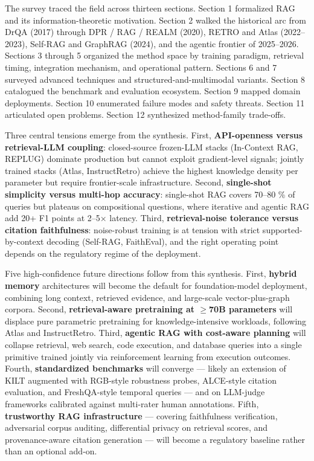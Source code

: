 \documentclass{article}
\begin{document}
The survey traced the field across thirteen sections. Section 1 formalized RAG and its information-theoretic motivation. Section 2 walked the historical arc from DrQA (2017) through DPR / RAG / REALM (2020), RETRO and Atlas (2022--2023), Self-RAG and GraphRAG (2024), and the agentic frontier of 2025--2026. Sections 3 through 5 organized the method space by training paradigm, retrieval timing, integration mechanism, and operational pattern. Sections 6 and 7 surveyed advanced techniques and structured-and-multimodal variants. Section 8 catalogued the benchmark and evaluation ecosystem. Section 9 mapped domain deployments. Section 10 enumerated failure modes and safety threats. Section 11 articulated open problems. Section 12 synthesized method-family trade-offs.

Three central tensions emerge from the synthesis. First, \textbf{API-openness versus retrieval-LLM coupling}: closed-source frozen-LLM stacks (In-Context RAG, REPLUG) dominate production but cannot exploit gradient-level signals; jointly trained stacks (Atlas, InstructRetro) achieve the highest knowledge density per parameter but require frontier-scale infrastructure. Second, \textbf{single-shot simplicity versus multi-hop accuracy}: single-shot RAG covers 70--80 \% of queries but plateaus on compositional questions, where iterative and agentic RAG add 20+ F1 points at 2--5× latency. Third, \textbf{retrieval-noise tolerance versus citation faithfulness}: noise-robust training \citep{yoran2024makingretrievalaug} is at tension with strict supported-by-context decoding (Self-RAG, FaithEval), and the right operating point depends on the regulatory regime of the deployment.

Five high-confidence future directions follow from this synthesis. First, \textbf{hybrid memory} architectures will become the default for foundation-model deployment, combining long context, retrieved evidence, and large-scale vector-plus-graph corpora. Second, \textbf{retrieval-aware pretraining at $\geq$70B parameters} will displace pure parametric pretraining for knowledge-intensive workloads, following Atlas and InstructRetro. Third, \textbf{agentic RAG with cost-aware planning} will collapse retrieval, web search, code execution, and database queries into a single primitive trained jointly via reinforcement learning from execution outcomes. Fourth, \textbf{standardized benchmarks} will converge --- likely an extension of KILT augmented with RGB-style robustness probes, ALCE-style citation evaluation, and FreshQA-style temporal queries --- and on LLM-judge frameworks calibrated against multi-rater human annotations. Fifth, \textbf{trustworthy RAG infrastructure} --- covering faithfulness verification, adversarial corpus auditing, differential privacy on retrieval scores, and provenance-aware citation generation --- will become a regulatory baseline rather than an optional add-on.
\end{document}
